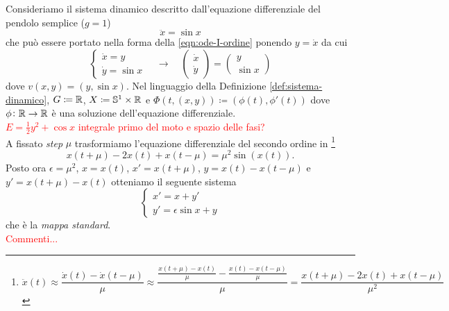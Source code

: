 \begin{example}
	Consideriamo il sistema dinamico descritto dall'equazione differenziale del pendolo semplice ($ g = 1 $)
	\[
		\ddot{x} = \sin{x}
	\]
	che può essere portato nella forma della \eqref{eqn:ode-I-ordine} ponendo $ y = \dot{x} $ da cui 
	\[
		\begin{cases}
			\dot{x} = y \\
			\dot{y} = \sin{x}
		\end{cases}
		\quad \rightarrow \quad
		\begin{pmatrix}
			\dot{x} \\ \dot{y}
		\end{pmatrix}
		=
		\begin{pmatrix}
			y \\ \sin{x}
		\end{pmatrix}
	\]
	dove $ v(x, y) = (y, \sin{x}) $. Nel linguaggio della Definizione \ref{def:sistema-dinamico}, $ G \coloneqq \mathbb{R} $, $ X \coloneqq \mathbb{S}^1 \times \mathbb{R}  $ e $ {\Phi(t, (x, y)) \coloneqq (\phi(t), \phi'(t))} $ dove $ \phi \colon \mathbb{R} \to \mathbb{R} $ è una soluzione dell'equazione differenziale. \\
	\textcolor{red}{$ E = \frac{1}{2}y^2 + \cos{x} $ integrale primo del moto e spazio  delle fasi?} \\
	A fissato \emph{step} $ \mu $ trasformiamo l'equazione differenziale del secondo ordine in \footnote{%
		\[
			\ddot{x}(t) \approx \frac{\dot{x}(t) - \dot{x}(t - \mu)}{\mu} \approx \frac{\frac{x(t + \mu) - x(t)}{\mu} - \frac{x(t) - x(t - \mu)}{\mu}}{\mu} = \frac{x(t + \mu) - 2x(t) + x(t - \mu)}{\mu^2}
		\]
	}
	\[
		x(t + \mu) - 2 x(t) + x(t - \mu) = \mu^2 \sin(x(t)).
	\]
	Posto ora $ \epsilon = \mu^2 $, $ x = x(t) $, $ x' = x(t + \mu) $, $ y = x(t) - x(t - \mu) $ e $ y' = x(t + \mu) - x(t) $ otteniamo il seguente sistema 
	\[
		\begin{cases}
			x' = x + y' \\
			y' = \epsilon \sin{x} + y 
		\end{cases}
	\]
	che è la \emph{mappa standard}. \\
	\textcolor{red}{Commenti...}
	

\end{example}
